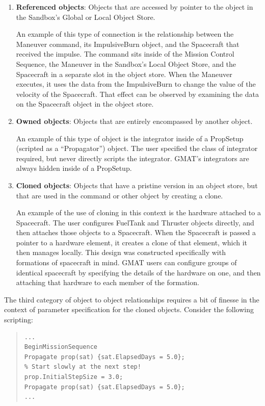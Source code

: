 \documentclass[10pt,letterpaper]{article}
\begin{document}
\begin{enumerate}
\item \textbf{Referenced objects}: Objects that are accessed by pointer to the object in the Sandbox's  Global or Local Object Store.  

An example of this type of connection is the relationship between the Maneuver command, its ImpulsiveBurn object, and the Spacecraft that received the impulse.  The command sits inside of the Mission Control Sequence, the Maneuver in the Sandbox's Local Object Store, and the Spacecraft in a separate slot in the object store.  When the Maneuver executes, it uses the data from the ImpulsiveBurn to change the value of the velocity of the Spacecraft.  That effect can be observed by examining the data on the Spacecraft object in the object store.
\item \textbf{Owned objects}: Objects that are entirely encompassed by another object. 

An example of this type of object is the integrator inside of a PropSetup (scripted as a ``Propagator'') object.  The user specified the class of integrator required, but never directly scripts the integrator.  GMAT's integrators are always hidden inside of a PropSetup.
\item \textbf{Cloned objects}: Objects that have a pristine version in an object store, but that are used in the command or other object by creating a clone.  

An example of the use of cloning in this context is the hardware attached to a Spacecraft.  The user configures FuelTank and Thruster objects directly, and then attaches those objects to a Spacecraft.  When the Spacecraft is passed a pointer to a hardware element, it creates a clone of that element, which it then manages locally.  This design was constructed specifically with formations of spacecraft in mind.  GMAT users can configure groups of identical spacecraft by specifying the details of the hardware on one, and then attaching that hardware to each member of the formation. 
\end{enumerate}

The third category of object to object relationships requires a bit of finesse in the context of parameter specification for the cloned objects.  Consider the following scripting:
\begin{quote}
\begin{verbatim}
...
BeginMissionSequence
Propagate prop(sat) {sat.ElapsedDays = 5.0};
% Start slowly at the next step!
prop.InitialStepSize = 3.0;
Propagate prop(sat) {sat.ElapsedDays = 5.0};
...
\end{verbatim}
\end{quote}
\end{document}
